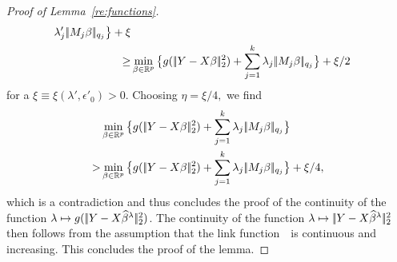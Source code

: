 \documentclass[bj]{imsart}
\newcommand{\normtwo}[1]{\ensuremath{\!|\!| #1 | \! |_{2}}}
\newcommand{\normqj}[1]{\ensuremath{\!|\!| #1 | \! |_{q_j}}}
\newcommand{\1}{{\rm 1}\mskip -4,5mu{\rm l} }
\def\R{\mathbb{R}}
\begin{document}
\begin{proof}[Proof of Lemma~\ref{re:functions}]
\begin{align*}
\lambda'_j\,\normqj{\fusedmatrix_j\beta}\big\}+\xi\\
\geq & \min_{\beta\in \R^p}\big\{g(\,\normtwo{\outcome-\design\beta}^2)+\sum_{j=1}^\numbergroups
\lambda_j\,\normqj{\fusedmatrix_j\beta}\big\}+\xi/2
\end{align*}
for a $\xi \equiv \xi (\lambda',\epsilon'_0)>0$. Choosing $\eta=\xi/4,$ we find
\begin{align*}
& \min_{\beta\in \R^p}\big\{g(\,\normtwo{\outcome-\design\beta}^2)+\sum_{j=1}^\numbergroups
\lambda_j\,\normqj{\fusedmatrix_j\beta}\big\}\\
> & \min_{\beta\in \R^p}\big\{g(\,\normtwo{\outcome-\design\beta}^2)+\sum_{j=1}^\numbergroups
\lambda_j\,\normqj{\fusedmatrix_j\beta}\big\}+\xi/4,
\end{align*}
which is a contradiction and thus concludes the proof of the continuity of the function $\tuningparameter\mapsto\linkfunction(\,\normtwo{\outcome-\design\estimatort}^2)$. The continuity of the function $\tuningparameter\mapsto\,\normtwo{\outcome-\design\estimatort}^2$ then follows from the assumption that the link function~\linkfunction\ is continuous and increasing. This concludes the proof of the lemma.
\end{proof}
\end{document}
